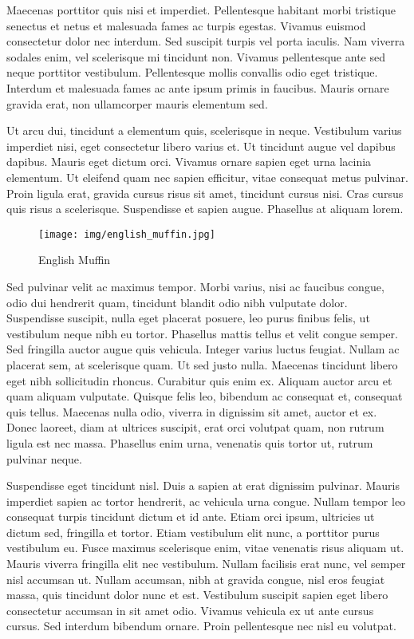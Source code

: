 \documentclass{llncs}
\begin{document}
Maecenas porttitor quis nisi et imperdiet. Pellentesque habitant morbi tristique senectus et netus et malesuada fames ac turpis egestas. Vivamus euismod consectetur dolor nec interdum. Sed suscipit turpis vel porta iaculis. Nam viverra sodales enim, vel scelerisque mi tincidunt non. Vivamus pellentesque ante sed neque porttitor vestibulum. Pellentesque mollis convallis odio eget tristique. Interdum et malesuada fames ac ante ipsum primis in faucibus. Mauris ornare gravida erat, non ullamcorper mauris elementum sed.

Ut arcu dui, tincidunt a elementum quis, scelerisque in neque. Vestibulum varius imperdiet nisi, eget consectetur libero varius et. Ut tincidunt augue vel dapibus dapibus. Mauris eget dictum orci. Vivamus ornare sapien eget urna lacinia elementum. Ut eleifend quam nec sapien efficitur, vitae consequat metus pulvinar. Proin ligula erat, gravida cursus risus sit amet, tincidunt cursus nisi. Cras cursus quis risus a scelerisque. Suspendisse et sapien augue. Phasellus at aliquam lorem.

\begin{figure}[h!]
	\begin{center}
	\texttt{[image: img/english\_muffin.jpg]}
	\caption{English Muffin \cite{Muffin:2015}}
	\label{fig:english_muffin}
	\end{center}
\end{figure}

Sed pulvinar velit ac maximus tempor. Morbi varius, nisi ac faucibus congue, odio dui hendrerit quam, tincidunt blandit odio nibh vulputate dolor. Suspendisse suscipit, nulla eget placerat posuere, leo purus finibus felis, ut vestibulum neque nibh eu tortor. Phasellus mattis tellus et velit congue semper. Sed fringilla auctor augue quis vehicula. Integer varius luctus feugiat. Nullam ac placerat sem, at scelerisque quam. Ut sed justo nulla. Maecenas tincidunt libero eget nibh sollicitudin rhoncus. Curabitur quis enim ex. Aliquam auctor arcu et quam aliquam vulputate. Quisque felis leo, bibendum ac consequat et, consequat quis tellus. Maecenas nulla odio, viverra in dignissim sit amet, auctor et ex. Donec laoreet, diam at ultrices suscipit, erat orci volutpat quam, non rutrum ligula est nec massa. Phasellus enim urna, venenatis quis tortor ut, rutrum pulvinar neque.

Suspendisse eget tincidunt nisl. Duis a sapien at erat dignissim pulvinar. Mauris imperdiet sapien ac tortor hendrerit, ac vehicula urna congue. Nullam tempor leo consequat turpis tincidunt dictum et id ante. Etiam orci ipsum, ultricies ut dictum sed, fringilla et tortor. Etiam vestibulum elit nunc, a porttitor purus vestibulum eu. Fusce maximus scelerisque enim, vitae venenatis risus aliquam ut. Mauris viverra fringilla elit nec vestibulum. Nullam facilisis erat nunc, vel semper nisl accumsan ut. Nullam accumsan, nibh at gravida congue, nisl eros feugiat massa, quis tincidunt dolor nunc et est. Vestibulum suscipit sapien eget libero consectetur accumsan in sit amet odio. Vivamus vehicula ex ut ante cursus cursus. Sed interdum bibendum ornare. Proin pellentesque nec nisl eu volutpat.
\end{document}
